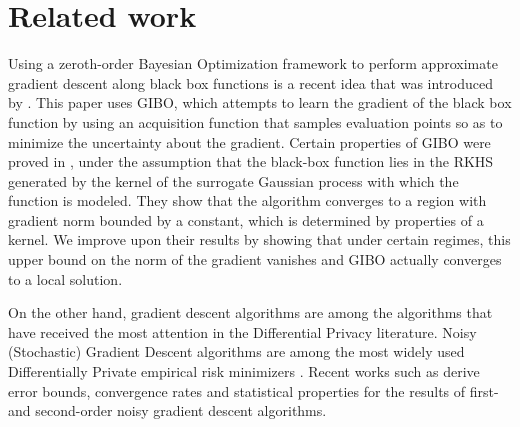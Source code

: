 \section{Related work}
Using a zeroth-order Bayesian Optimization framework to perform approximate gradient descent along black box functions is a recent idea that was introduced by \cite{muller2021local}. This paper uses GIBO, which attempts to learn the gradient of the black box function by using an acquisition function that samples evaluation points so as to minimize the uncertainty about the gradient. Certain properties of GIBO were proved in \cite{wu2024behavior}, under the assumption that the black-box function lies in the RKHS generated by the kernel of the surrogate Gaussian process with which the function is modeled. They show that the algorithm converges to a region with gradient norm bounded by a constant, which is determined by properties of a kernel. We improve upon their results by showing that under certain regimes, this upper bound on the norm of the gradient vanishes and GIBO actually converges to a local solution. 

On the other hand, gradient descent algorithms are among the algorithms that have received the most attention in the Differential Privacy literature. Noisy (Stochastic) Gradient Descent algorithms are among the most widely used Differentially Private empirical risk minimizers \citep{privateSGD, privateGD2, privateGD3}. Recent works such as \cite{avella2023differentially} derive error bounds, convergence rates and statistical properties  for the results of first- and second-order noisy gradient descent algorithms.